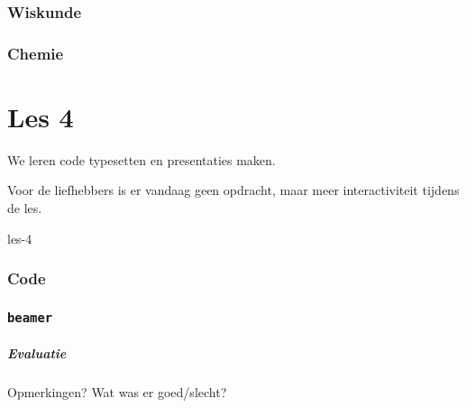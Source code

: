 \documentclass{beamer}
\begin{document}
\section{Wiskunde}

\section{Chemie}



\part{Les 4}
\lecture
{We leren code typesetten en presentaties maken.

Voor de liefhebbers is er vandaag geen opdracht, maar meer interactiviteit tijdens de les.}
{les-4}
\section{Code}

\section{\texttt{beamer}}


\begin{frame}
  \frametitle{Evaluatie}

  Opmerkingen? Wat was er goed/slecht?
\end{frame}
\end{document}
